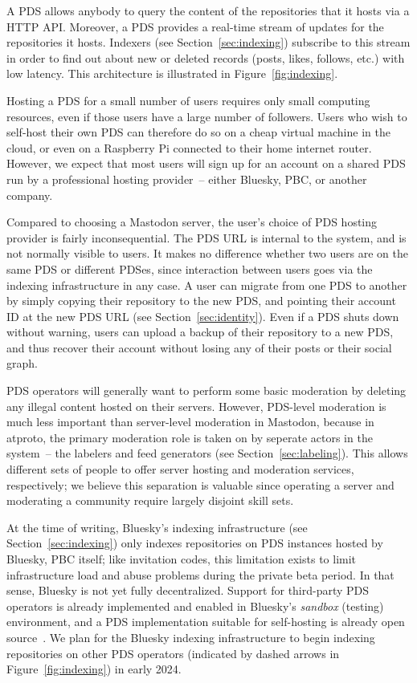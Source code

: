 \documentclass[sigconf,review]{acmart}
\begin{document}
A PDS allows anybody to query the content of the repositories that it hosts via a HTTP API.
Moreover, a PDS provides a real-time stream of updates for the repositories it hosts.
Indexers (see Section~\ref{sec:indexing}) subscribe to this stream in order to find out about new or deleted records (posts, likes, follows, etc.) with low latency.
This architecture is illustrated in Figure~\ref{fig:indexing}.

Hosting a PDS for a small number of users requires only small computing resources, even if those users have a large number of followers.
Users who wish to self-host their own PDS can therefore do so on a cheap virtual machine in the cloud, or even on a Raspberry Pi connected to their home internet router.
However, we expect that most users will sign up for an account on a shared PDS run by a professional hosting provider~-- either Bluesky, PBC, or another company.

Compared to choosing a Mastodon server, the user's choice of PDS hosting provider is fairly inconsequential.
The PDS URL is internal to the system, and is not normally visible to users.
It makes no difference whether two users are on the same PDS or different PDSes, since interaction between users goes via the indexing infrastructure in any case.
A user can migrate from one PDS to another by simply copying their repository to the new PDS, and pointing their account ID at the new PDS URL (see Section~\ref{sec:identity}).
Even if a PDS shuts down without warning, users can upload a backup of their repository to a new PDS, and thus recover their account without losing any of their posts or their social graph.

PDS operators will generally want to perform some basic moderation by deleting any illegal content hosted on their servers.
However, PDS-level moderation is much less important than server-level moderation in Mastodon, because in atproto, the primary moderation role is taken on by seperate actors in the system~-- the labelers and feed generators (see Section~\ref{sec:labeling}).
This allows different sets of people to offer server hosting and moderation services, respectively; we believe this separation is valuable since operating a server and moderating a community require largely disjoint skill sets.

At the time of writing, Bluesky's indexing infrastructure (see Section~\ref{sec:indexing}) only indexes repositories on PDS instances hosted by Bluesky, PBC itself; like invitation codes, this limitation exists to limit infrastructure load and abuse problems during the private beta period.
In that sense, Bluesky is not yet fully decentralized.
Support for third-party PDS operators is already implemented and enabled in Bluesky's \emph{sandbox} (testing) environment, and a PDS implementation suitable for self-hosting is already open source~\cite{BlueskyGithub}.
We plan for the Bluesky indexing infrastructure to begin indexing repositories on other PDS operators (indicated by dashed arrows in Figure~\ref{fig:indexing}) in early 2024.
\end{document}
